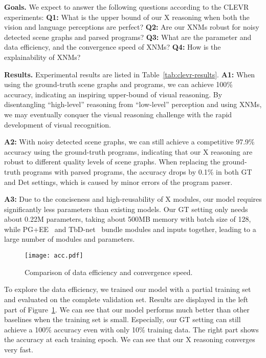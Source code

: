 \documentclass[10pt,twocolumn,letterpaper]{article}
\begin{document}
\textbf{Goals.}
We expect to answer the following questions according to the CLEVR experiments:
\textbf{Q1:} What is the upper bound of our X reasoning when both the vision and language perceptions are perfect?
\textbf{Q2:} Are our XNMs robust for noisy detected scene graphs and parsed programs?
\textbf{Q3:} What are the parameter and data efficiency, and the convergence speed of XNMs?
\textbf{Q4:} How is the explainability of XNMs?

\textbf{Results.}
Experimental results are listed in Table~\ref{tab:clevr-results}.
\textbf{A1:}
When using the ground-truth scene graphs and programs, we can achieve 100\% accuracy, indicating an inspiring upper-bound of visual reasoning.
By disentangling ``high-level'' reasoning from ``low-level'' perception and using XNMs, we may eventually conquer the visual reasoning challenge with the rapid development of visual recognition.

\textbf{A2:}
With noisy detected scene graphs, we can still achieve a competitive 97.9\% accuracy using the ground-truth programs, indicating that our X reasoning are robust to different quality levels of scene graphs.
When replacing the ground-truth programs with parsed programs, the accuracy drops by 0.1\% in both GT and Det settings, which is caused by minor errors of the program parser.

\textbf{A3:}
Due to the conciseness and high-reusability of X modules, our model requires significantly less parameters than existing models. 
Our GT setting only needs about 0.22M parameters, taking about 500MB memory with batch size of 128, while
PG+EE~\cite{johnson2017inferring} and TbD-net~\cite{mascharka2018transparency} bundle modules and inputs together, leading to a large number of modules and parameters.

\begin{figure}[h]
\texttt{[image: acc.pdf]}
\caption{Comparison of data efficiency and convergence speed.}
\label{fig:efficiency}
\vspace{-0.2cm}
\end{figure}


To explore the data efficiency, we trained our model with a partial training set and evaluated on the complete validation set.
Results are displayed in the left part of Figure~\ref{fig:efficiency}.
We can see that our model performs much better than other baselines when the training set is small.
Especially, our GT setting can still achieve a 100\% accuracy even with only 10\% training data.
The right part shows the accuracy at each training epoch.
We can see that our X reasoning converges very fast.
\end{document}
